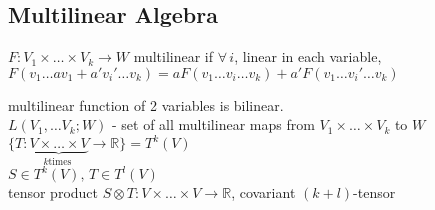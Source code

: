 %                                               
%                                                              
%



\subsection*{ Multilinear Algebra }



$F: V_1 \times \dots \times V_k \to W$ multilinear if $\forall \, i$, linear in each variable, $F(v_1 \dots a v_1 + a' v_i' \dots v_k) = aF(v_1 \dots v_i \dots v_k) + a'F(v_1 \dots v_i' \dots v_k)$

multilinear function of 2 variables is bilinear.  \\

$L(V_1, \dots V_k; W)$ - set of all multilinear maps from $V_1 \times \dots \times V_k$ to $W$ \\

$\lbrace T: \underbrace{V\times \dots \times V}_{k \text{times }} \to \mathbb{R} \rbrace = T^k(V)$  \\

$S\in T^k(V), \, T\in T^l(V)$  \\
tensor product $S\otimes T: V \times \dots \times V \to \mathbb{R}$, covariant $(k+l)$-tensor


